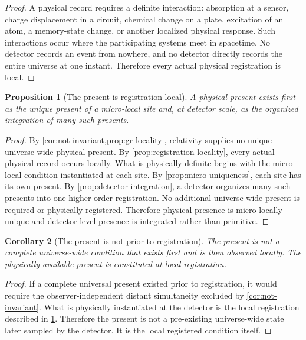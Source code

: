 \documentclass[12pt,onecolumn]{article}
\newtheorem{proposition}{Proposition}[section]
\newtheorem{corollary}[proposition]{Corollary}
\begin{document}
\begin{proof}
A physical record requires a definite interaction: absorption at a sensor, charge displacement in a circuit, chemical change on a plate, excitation of an atom, a memory-state change, or another localized physical response. Such interactions occur where the participating systems meet in spacetime. No detector records an event from nowhere, and no detector directly records the entire universe at one instant. Therefore every actual physical registration is local.
\end{proof}

\begin{proposition}[The present is registration-local]
\label{prop:present-local}
A physical present exists first as the unique present of a micro-local site and, at detector scale, as the organized integration of many such presents.
\end{proposition}

\begin{proof}
By \cref{cor:not-invariant,prop:gr-locality}, relativity supplies no unique universe-wide physical present. By \cref{prop:registration-locality}, every actual physical record occurs locally. What is physically definite begins with the micro-local condition instantiated at each site. By \cref{prop:micro-uniqueness}, each site has its own present. By \cref{prop:detector-integration}, a detector organizes many such presents into one higher-order registration. No additional universe-wide present is required or physically registered. Therefore physical presence is micro-locally unique and detector-level presence is integrated rather than primitive.
\end{proof}

\begin{corollary}[The present is not prior to registration]
\label{cor:not-prior}
The present is not a complete universe-wide condition that exists first and is then observed locally. The physically available present is constituted at local registration.
\end{corollary}

\begin{proof}
If a complete universal present existed prior to registration, it would require the observer-independent distant simultaneity excluded by \cref{cor:not-invariant}. What is physically instantiated at the detector is the local registration described in \cref{prop:present-local}. Therefore the present is not a pre-existing universe-wide state later sampled by the detector. It is the local registered condition itself.
\end{proof}
\end{document}
